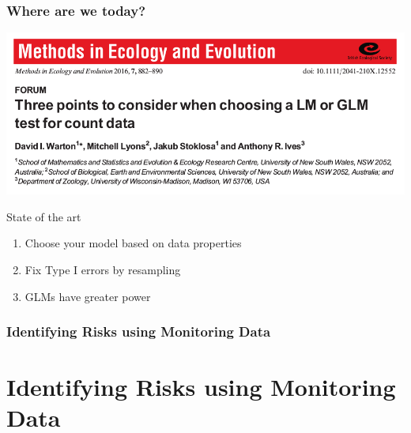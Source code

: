 \documentclass[
	12pt
	]{beamer}
\begin{document}
\begin{frame}
\frametitle{Where are we today?}
	\includegraphics[width=\textwidth]{figs/tikz/glm_hist/warton_2016.png}
	\pause
	\vspace*{-5mm}
	\begin{exampleblock}{State of the art}
		\begin{enumerate}
			\item Choose your model based on data properties
			\item Fix Type I errors by resampling
			\item GLMs have greater power 
		\end{enumerate}
	\end{exampleblock}
\end{frame}




\begingroup
\footnotesize %
\begin{frame}
\frametitle{Identifying Risks using Monitoring Data}
    \vspace*{5mm}
	\resizebox{1.1\textwidth}{!}{
		\hspace*{-20mm}
	}
\end{frame}
\endgroup



\section{Identifying Risks using Monitoring Data}
\end{document}
